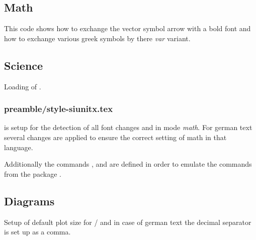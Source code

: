 
\subsection{Math}

This code shows how to exchange the vector symbol arrow with a bold font and how to exchange various greek symbols by there \emph{var} variant.


\subsection{Science}

Loading of .


\subsubsection{preamble/style-siunitx.tex}

 is setup for the detection of all font changes and in mode \emph{math}. For german text several changes are applied to ensure the correct setting of math in that language.

Additionally the commands ,  and  are defined in order to emulate the commands from the package .


\subsection{Diagrams}

Setup of default plot size for / and in case of german text the decimal separator is set up as a comma.

